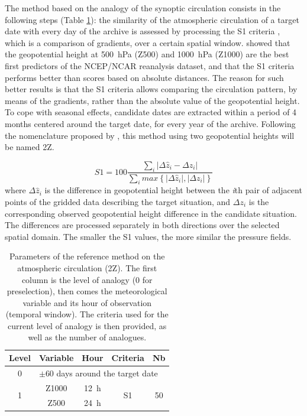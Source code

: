 \documentclass[5p]{elsarticle}
\begin{document}
The method based on the analogy of the synoptic circulation consists in the following steps (Table \ref{table:params_R1}): the similarity of the atmospheric circulation of a target date with every day of the archive is assessed by processing the S1 criteria \citep[Eq.\ \ref{eq:S1}, ][]{Teweles1954, Drosdowsky2003}, which is a comparison of gradients, over a certain spatial window. \citet{Bontron2005} showed that the geopotential height at 500~hPa (Z500) and 1000~hPa (Z1000) are the best first predictors of the NCEP/NCAR reanalysis dataset, and that the S1 criteria performs better than scores based on absolute distances. The reason for such better results is that the S1 criteria allows comparing the circulation pattern, by means of the gradients, rather than the absolute value of the geopotential height. To cope with seasonal effects, candidate dates are extracted within a period of 4 months centered around the target date, for every year of the archive. Following the nomenclature proposed by \citet{Horton2016}, this method using two geopotential heights will be named 2Z.

\begin{equation}
\label{eq:S1}
S1=100 \frac {\displaystyle \sum_{i} \vert \Delta\hat{z}_{i} - \Delta z_{i} \vert}
{\displaystyle \sum_{i} max\left\lbrace \vert \Delta\hat{z}_{i} \vert , \vert \Delta z_{i} \vert \right\rbrace }
\end{equation}
where $\Delta \hat{z}_{i}$ is the difference in geopotential height between the \textit{i}th pair of adjacent points of the gridded data describing the target situation, and $\Delta z_{i}$ is the corresponding observed geopotential height difference in the candidate situation. The differences are processed separately in both directions over the selected spatial domain. The smaller the S1 values, the more similar the pressure fields.

\begin{table}[htb]
	\caption{Parameters of the reference method on the atmospheric circulation (2Z). The first column is the level of analogy (0 for preselection), then comes the meteorological variable and its hour of observation (temporal window). The criteria used for the current level of analogy is then provided, as well as the number of analogues.}
	\footnotesize
	\begin{center}
		\begin{tabular}{ccccc}
			\hline
			Level & Variable & Hour & Criteria & Nb \\ 
			\hline 
			0 & \multicolumn{4}{l}{$\pm 60$ days around the target date} \\
			\hline 
			\multirow{2}{*}{1} & Z1000 & 12~h & \multirow{2}{*}{S1} & \multirow{2}{*}{50} \\
			& Z500 & 24~h & & \\ 
			\hline 
		\end{tabular} 
	\end{center}
	\label{table:params_R1}
\end{table}
\end{document}
